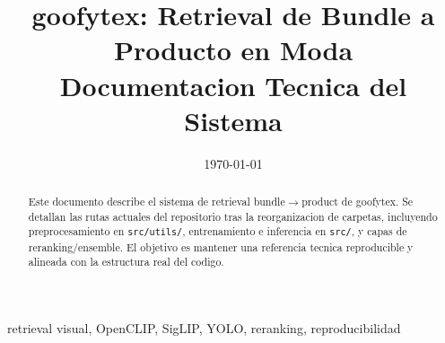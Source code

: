 \documentclass[conference]{IEEEtran}
\title{goofytex: Retrieval de Bundle a Producto en Moda\\Documentacion Tecnica del Sistema}
\author{
\IEEEauthorblockN{Equipo goofytex}
\IEEEauthorblockA{Informe Tecnico Interno}
}
\date{\today}
\begin{document}
\maketitle

\begin{abstract}
Este documento describe el sistema de retrieval bundle$\rightarrow$product de goofytex. Se detallan las rutas actuales del repositorio tras la reorganizacion de carpetas, incluyendo preprocesamiento en \texttt{src/utils/}, entrenamiento e inferencia en \texttt{src/}, y capas de reranking/ensemble. El objetivo es mantener una referencia tecnica reproducible y alineada con la estructura real del codigo.
\end{abstract}

\begin{IEEEkeywords}
retrieval visual, OpenCLIP, SigLIP, YOLO, reranking, reproducibilidad
\end{IEEEkeywords}













\appendix

\end{document}
